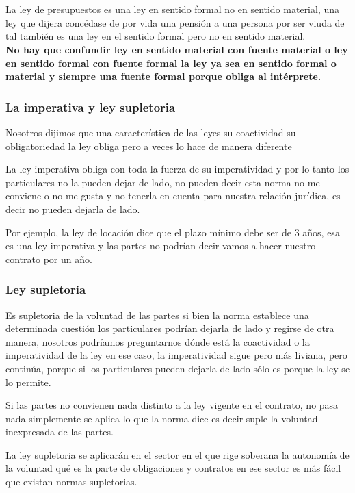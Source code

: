 \documentclass[12pt]{book}
\begin{document}
\\
\\
La ley de presupuestos es una ley en sentido formal no en sentido material,
una ley que dijera concédase de por vida una pensión a una persona por ser viuda de tal también es una ley en el sentido formal pero no en sentido material.
\\
\textbf{No hay que confundir ley en sentido material con fuente material o ley en sentido formal con fuente formal la ley ya sea en sentido formal o material y siempre una fuente formal porque obliga al intérprete.}

\subsubsection{La imperativa y ley supletoria}

Nosotros dijimos que una característica de las leyes su coactividad su obligatoriedad la ley obliga pero a veces lo hace de manera diferente

La ley imperativa obliga con toda la fuerza de su imperatividad y por lo tanto los particulares no la pueden dejar de lado, no pueden decir esta norma no me conviene o no me gusta y no tenerla en cuenta para nuestra relación jurídica, es decir no pueden dejarla de lado.

Por ejemplo, la ley de locación dice que el plazo mínimo debe ser de 3 años, esa es una ley imperativa y las partes no podrían decir vamos a hacer nuestro contrato por un año.

\subsubsection{Ley supletoria}
Es supletoria de la voluntad de las partes si bien la norma establece una determinada cuestión los particulares podrían dejarla de lado y regirse de otra manera, nosotros podríamos preguntarnos dónde está la coactividad o la imperatividad de la ley en ese caso, la imperatividad sigue pero más liviana, pero continúa, porque si los particulares pueden dejarla de lado sólo es porque la ley se lo permite.

Si las partes no convienen nada distinto a la ley vigente en el contrato, no pasa nada simplemente se aplica lo que la norma dice es decir suple la voluntad inexpresada de las partes.

La ley supletoria se aplicarán en el sector en el que rige soberana la autonomía de la voluntad qué es la parte de obligaciones y contratos en ese sector es más fácil que existan normas supletorias.
\end{document}
